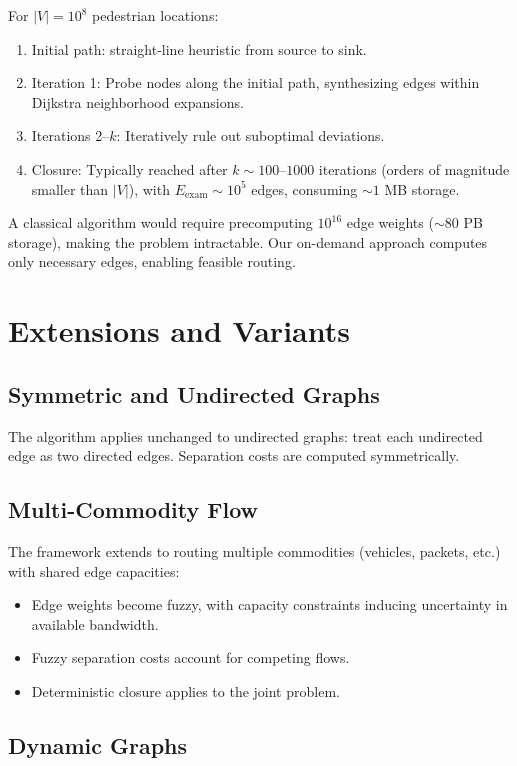 \documentclass[twocolumn,11pt,a4paper]{article}
\theoremstyle{definition}
\begin{document}
For $|V| = 10^8$ pedestrian locations:
\begin{enumerate}
\item Initial path: straight-line heuristic from source to sink.
\item Iteration 1: Probe nodes along the initial path, synthesizing edges within Dijkstra neighborhood expansions.
\item Iterations 2--$k$: Iteratively rule out suboptimal deviations.
\item Closure: Typically reached after $k \sim 100$--$1000$ iterations (orders of magnitude smaller than $|V|$), with $E_{\text{exam}} \sim 10^5$ edges, consuming $\sim 1$ MB storage.
\end{enumerate}

A classical algorithm would require precomputing $10^{16}$ edge weights ($\sim 80$ PB storage), making the problem intractable. Our on-demand approach computes only necessary edges, enabling feasible routing.

\section{Extensions and Variants}

\subsection{Symmetric and Undirected Graphs}

The algorithm applies unchanged to undirected graphs: treat each undirected edge as two directed edges. Separation costs are computed symmetrically.

\subsection{Multi-Commodity Flow}

The framework extends to routing multiple commodities (vehicles, packets, etc.) with shared edge capacities:
\begin{itemize}
\item Edge weights become fuzzy, with capacity constraints inducing uncertainty in available bandwidth.
\item Fuzzy separation costs account for competing flows.
\item Deterministic closure applies to the joint problem.
\end{itemize}

\subsection{Dynamic Graphs}
\end{document}
